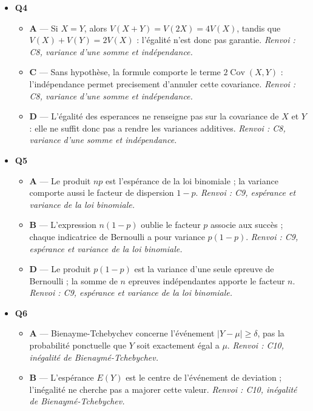 \begin{itemize}
\begin{itemize}
    \item \textbf{D} — La propriété est toujours valable ; par exemple pour deux constantes $X=1$ et $Y=2$, les deux membres valent $3$. \emph{Renvoi : C7, linéarité de l'espérance.}
  \end{itemize}
  \item \textbf{Q4}
  \begin{itemize}
    \item \textbf{A} — Si $X=Y$, alors $V(X+Y)=V(2X)=4V(X)$, tandis que $V(X)+V(Y)=2V(X)$ : l'égalité n'est donc pas garantie. \emph{Renvoi : C8, variance d'une somme et indépendance.}
    \item \textbf{C} — Sans hypothèse, la formule comporte le terme $2\operatorname{Cov}(X,Y)$ : l'indépendance permet precisement d'annuler cette covariance. \emph{Renvoi : C8, variance d'une somme et indépendance.}
    \item \textbf{D} — L'égalité des esperances ne renseigne pas sur la covariance de $X$ et $Y$ : elle ne suffit donc pas a rendre les variances additives. \emph{Renvoi : C8, variance d'une somme et indépendance.}
  \end{itemize}
  \item \textbf{Q5}
  \begin{itemize}
    \item \textbf{A} — Le produit $np$ est l'espérance de la loi binomiale ; la variance comporte aussi le facteur de dispersion $1-p$. \emph{Renvoi : C9, espérance et variance de la loi binomiale.}
    \item \textbf{B} — L'expression $n(1-p)$ oublie le facteur $p$ associe aux succès ; chaque indicatrice de Bernoulli a pour variance $p(1-p)$. \emph{Renvoi : C9, espérance et variance de la loi binomiale.}
    \item \textbf{D} — Le produit $p(1-p)$ est la variance d'une seule epreuve de Bernoulli ; la somme de $n$ epreuves indépendantes apporte le facteur $n$. \emph{Renvoi : C9, espérance et variance de la loi binomiale.}
  \end{itemize}
  \item \textbf{Q6}
  \begin{itemize}
    \item \textbf{A} — Bienayme-Tchebychev concerne l'événement $|Y-\mu|\geq\delta$, pas la probabilité ponctuelle que $Y$ soit exactement égal a $\mu$. \emph{Renvoi : C10, inégalité de Bienaymé-Tchebychev.}
    \item \textbf{B} — L'espérance $E(Y)$ est le centre de l'événement de deviation ; l'inégalité ne cherche pas a majorer cette valeur. \emph{Renvoi : C10, inégalité de Bienaymé-Tchebychev.}

\end{itemize}
\end{itemize}
